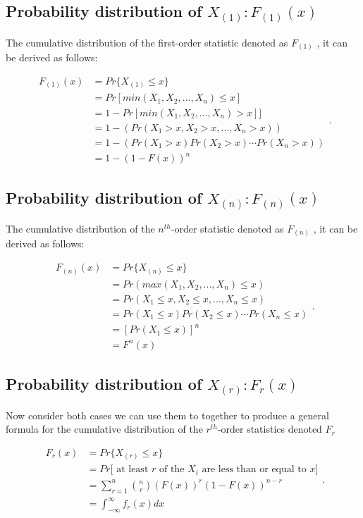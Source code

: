 \documentclass[11pt,a4paper]{article}
\theoremstyle{plain}
\begin{document}
\subsection*{Probability distribution of $X_{(1)}:F_{(1)}(x)$}
The cumulative distribution of the first-order statistic denoted as $F_{(1)}$ , it can be derived as follows:
\begin{center}
\[
     \begin{array}{ll}
                F_{(1)}(x) &=Pr\{X_{(1)} \leq x\} \\
                 &=Pr[min(X_1,X_2,...,X_n)\leq x]\\
                 &=1-Pr[min(X_1,X_2,...,X_n)> x]]\\
                 &=1-(Pr(X_1> x,X_2> x,...,X_n> x))\\
                 &=1-(Pr(X_1> x)Pr(X_2> x)\cdots Pr(X_n> x))\\
                 &=1-(1-F(x))^n
                \end{array}
             .
  \]


\end{center}

\subsection*{Probability distribution of $X_{(n)}:F_{(n)}(x)$}
 The cumulative distribution of the $n^{th}$-order statistic denoted as $F_{(n)}$ , it can be derived as follows:

\begin{center}
 \[
     \begin{array}{ll}
F_{(n)}(x)&=Pr\{X_{(n)} \leq x\}\\
&=Pr(max(X_1,X_2,...,X_n)\leq x)\\
&=Pr(X_1\leq x,X_2\leq x,...,X_n\leq x)\\
&=Pr(X_1\leq x)Pr(X_2\leq x)\cdots Pr(X_n\leq x)\\
&=[Pr(X_1\leq x)]^n\\
&=F^n(x)
\end{array}
             .
   \]
\end{center}

\subsection*{Probability distribution of $X_{(r)}:F_r(x)$}
Now consider both cases we can use them to together to produce a general formula for the cumulative distribution of the $r^{th}$-order statistics denoted $F_r$
\begin{center}
\[
     \begin{array}{ll}
F_r(x)&=Pr\{X_{(r)}\leq x\}\\
&= Pr[\text{ at least $r$ of the $X_i$ are less than or equal to $x$]}\\
&=\sum_{r=1}^n\binom{n}{r}(F(x))^r(1-F(x))^{n-r}\\
&=\int_{-\infty}^{\infty}f_r(x)dx
\end{array}
             .
   \]
\end{center}
\end{document}
